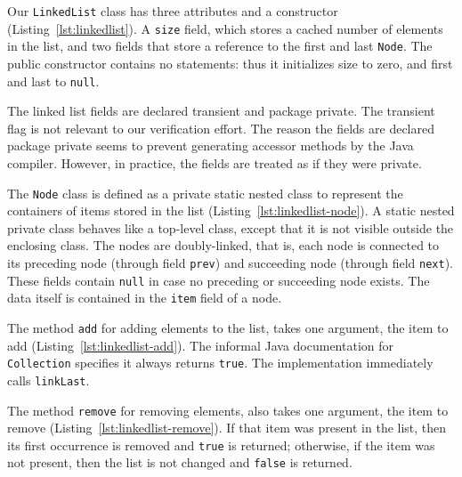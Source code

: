 \documentclass[runningheads]{llncs}
\theoremstyle{remark}
\begin{document}
Our \texttt{LinkedList} class has three attributes and a constructor (Listing~\ref{lst:linkedlist}). A \texttt{size} field, which stores a cached number of elements in the list, and two fields that store a reference to the first and last \texttt{Node}. The public constructor contains no statements: thus it initializes size to zero, and first and last to \texttt{null}.

The linked list fields are declared transient and package private. The transient flag is not relevant to our verification effort. The reason the fields are declared package private seems to prevent generating accessor methods by the Java compiler. However, in practice, the fields are treated as if they were private.



The \texttt{Node} class is defined as a private static nested class to represent the containers of items stored in the list (Listing~\ref{lst:linkedlist-node}). A static nested private class behaves like a top-level class, except that it is not visible outside the enclosing class. The nodes are doubly-linked, that is, each node is connected to its preceding node (through field \texttt{prev}) and succeeding node (through field \texttt{next}). These fields contain \texttt{null} in case no preceding or succeeding node exists. The data itself is contained in the \texttt{item} field of a node.

\pagebreak



The method \texttt{add} for adding elements to the list, takes one argument, the item to add (Listing~\ref{lst:linkedlist-add}). The informal Java documentation for \texttt{Collection} specifies it always returns \texttt{true}. The implementation immediately calls \texttt{linkLast}.



The method \texttt{remove} for removing elements, also takes one argument, the item to remove (Listing~\ref{lst:linkedlist-remove}). If that item was present in the list, then its first occurrence is removed and \texttt{true} is returned; otherwise, if the item was not present, then the list is not changed and \texttt{false} is returned.
\end{document}
